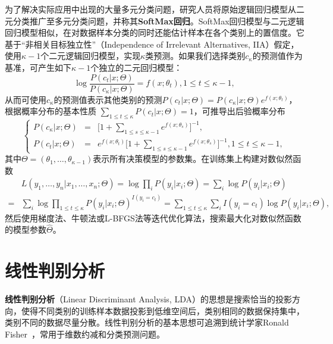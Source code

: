 为了解决实际应用中出现的大量多元分类问题，研究人员将原始逻辑回归模型从二元分类推广至多元分类问题，并称其\textbf{SoftMax回归}。SoftMax回归模型与二元逻辑回归模型相似，在对数据样本分类的同时还能估计样本在各个类别上的置信度。它基于“非相关目标独立性”（Independence of Irrelevant Alternatives, IIA）假定，使用$\kappa-1$个二元逻辑回归模型，实现$\kappa$类预测。如果我们选择类别$c_\kappa$的预测值作为基准，可产生如下$\kappa-1$个独立的二元回归模型：
\begin{equation}
    \log \frac{P(c_t|x;\Theta)}{P(c_\kappa|x;\Theta)} = f(x;\theta_t), 1\le t\le \kappa-1,
\end{equation}
从而可使用$c_\kappa$的预测值表示其他类别的预测$P(c_t|x;\Theta) = P(c_\kappa|x;\Theta) e^{f(x;\theta_t)}$，根据概率分布的基本性质
$\sum\limits_{1\le t\le \kappa}P(c_t|x;\Theta) = 1$，可推导出后验概率分布
\begin{equation}
    \left\{
    \begin{array}{rcl}
      P(c_\kappa|x;\Theta)  &=& \Big[1+\sum\limits_{1\le s\le \kappa-1} e^{f(x;\theta_s)}\Big]^{-1}, \\
      P(c_t|x;\Theta)  &=& e^{f(x;\theta_t)}\Big[1+\sum\limits_{1\le s\le \kappa-1} e^{f(x;\theta_s)}\Big]^{-1}, 1\le t\le \kappa-1,
    \end{array}
    \right.
\end{equation}
其中$\Theta=(\theta_1,\ldots,\theta_{\kappa-1})$表示所有决策模型的参数集。在训练集上构建对数似然函数
\begin{equation}
    \begin{array}{rl}
      & L(y_1,\ldots,y_n|x_1,\ldots,x_n;\Theta) = \log \prod\limits_i P(y_i|x_i;\Theta) =  \sum\limits_i \log P(y_i|x_i;\Theta) \\
       = & \sum\limits_i \log \prod\limits_{1\le t\le \kappa} P(y_i|x_i;\Theta)^{I(y_i=c_t)} = \sum\limits_{1\le t\le \kappa} \sum\limits_i I(y_i=c_t) \log P(y_i|x_i;\Theta),
    \end{array}
\end{equation}
然后使用梯度法、牛顿法或L-BFGS法等迭代优化算法，搜索最大化对数似然函数的模型参数$\hat \Theta$。

\section{线性判别分析}
\textbf{线性判别分析}（Linear Discriminant Analysis, LDA）的思想是搜索恰当的投影方向，使得不同类别的训练样本数据投影到低维空间后，类别相同的数据保持集中，类别不同的数据尽量分散。线性判别分析的基本思想可追溯到统计学家Ronald Fisher~\cite{fisher1936use}，常用于维数约减和分类预测问题。
